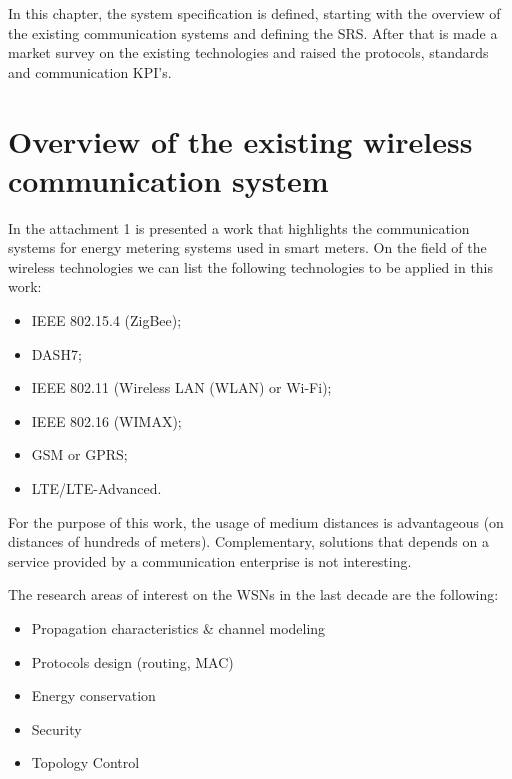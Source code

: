 
In this chapter, the system specification is defined, starting with the overview of the existing communication systems and defining the SRS. After that is made a market survey on the existing technologies and raised the protocols, standards and communication KPI's.



\section{Overview of the existing wireless communication system}
In the attachment 1 is presented a work that highlights the communication systems for energy metering systems used in smart meters. On the field of the wireless technologies we can list the following technologies to be applied in this work:

\begin{itemize}
	\setlength\itemsep{-0.5em}
	\item IEEE 802.15.4 (ZigBee);
	\item DASH7;
	\item IEEE 802.11 (Wireless LAN (WLAN) or Wi-Fi);
	\item IEEE 802.16 (WIMAX);
	\item GSM or GPRS;
	\item LTE/LTE-Advanced.	
\end{itemize}

For the purpose of this work, the usage of medium distances is advantageous (on distances of hundreds of meters). Complementary, solutions that depends on a service provided by a communication enterprise is not interesting. 


The research areas of interest on the WSNs in the last decade are the following:

\begin{itemize}
	\setlength\itemsep{-0.5em}
	\item Propagation characteristics \& channel modeling
	\item Protocols design (routing, MAC)
	\item Energy conservation
	\item Security
	\item Topology Control

\end{itemize}

